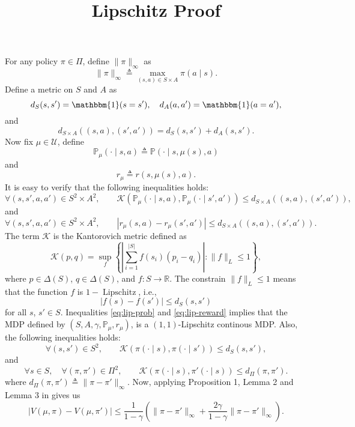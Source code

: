 \documentclass{article}
\newcommand{\tmop}[1]{\ensuremath{\operatorname{#1}}}
\begin{document}
\title{Lipschitz Proof}

\maketitle

For any policy $\pi \in \Pi$, define $\| \pi \|_{\infty}$ as
\[ \| \pi \|_{\infty} \triangleq \max_{(s, a) \in S \times A} \pi (a \mid s)
   . \]
Define a metric on $S$ and $A$ as
\[ d_S (s, s') = \mathbbm{1} (s = s'), \quad d_A (a, a') = \mathbbm{1} (a =
   a'), \]
and
\[ d_{S \times A} ((s, a), (s', a')) = d_S (s, s') + d_A (s, s') . \]
Now fix $\mu \in \mathcal{U}$, define
\[ \mathbb{P}_{\mu} (\cdot \mid s, a) \triangleq \mathbb{P} (\cdot \mid s, \mu
   (s), a) \]
and
\[ r_{\mu} \triangleq r (s, \mu (s), a) . \]
It is easy to verify that the following inequalities holds:
\begin{equation}
  \forall (s, s', a, a') \in S^2 \times A^2, \qquad \mathcal{K}
  (\mathbb{P}_{\mu} (\cdot \mid s, a), \mathbb{P}_{\mu} (\cdot \mid s', a'))
  \leq d_{S \times A} ((s, a), (s', a')), \label{eq:lip-prob}
\end{equation}
and
\begin{equation}
  \forall (s, s', a, a') \in S^2 \times A^2, \qquad | r_{\mu} (s, a) - r_{\mu}
  (s', a') | \leq d_{S \times A} ((s, a), (s', a')) . \label{eq:lip-reward}
\end{equation}
The term $\mathcal{K}$ is the Kantorovich metric defined as
\[ \mathcal{K} (p, q) = \sup_f \left\{ \left| \sum_{i = 1}^{| S |} f (s_i)
   (p_i - q_i) \right| : \| f \|_L \leq 1 \right\}, \]
where $p \in \Delta (S)$, $q \in \Delta (S)$, and $f : S \rightarrow
\mathbb{R}$. The constrain $\| f \|_L \leq 1$ means that the function $f$ is
$1 - \tmop{Lipschitz}$, i.e.,
\[ | f (s) - f (s') | \leq d_S (s, s') \]
for all $s$, $s' \in S$. Inequalities \eqref{eq:lip-prob} and
\eqref{eq:lip-reward} implies that the MDP defined by $(S, A, \gamma,
\mathbb{P}_{\mu}, r_{\mu})$, is a $(1, 1)$-Lipschitz continous MDP. Also, the
following inequalities holds:
\[ \forall (s, s') \in S^2, \qquad \mathcal{K} (\pi (\cdot \mid s), \pi (\cdot
   \mid s')) \leq d_S (s, s'), \]
and
\[ \forall s \in S, \quad \forall (\pi, \pi') \in \Pi^2, \qquad \mathcal{K}
   (\pi (\cdot \mid s), \pi' (\cdot \mid s)) \leq d_{\Pi} (\pi, \pi') . \]
where $d_{\Pi} (\pi, \pi') \triangleq \| \pi - \pi' \|_{\infty}$. Now,
applying Proposition 1, Lemma 2 and Lemma $3$ in {\cite{pirotta_policy_2015}}
gives us
\[ | V (\mu, \pi) - V (\mu, \pi') | \leq \frac{1}{1 - \gamma} \left( \| \pi -
   \pi' \|_{\infty} + \frac{2 \gamma}{1 - \gamma} \| \pi - \pi' \|_{\infty}
   \right) . \]



\end{document}
